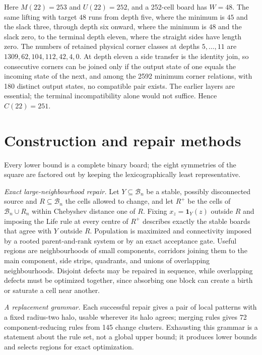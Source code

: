 \documentclass[10pt]{article}
\theoremstyle{remark}
\newcommand{\B}{\mathcal B}
\begin{document}
Here $M(22)=253$ and $U(22)=252$, and a 252-cell board has $W=48$.  The same
lifting with target $48$ runs from depth five, where the minimum is $45$ and the
slack three, through depth six onward, where the minimum is $48$ and the slack
zero, to the terminal depth eleven, where the straight sides have length zero.
The numbers of retained physical corner classes at depths $5,\ldots,11$ are
$1309,62,104,112,42,4,0$.  At depth eleven a side transfer is the identity join,
so consecutive corners can be joined only if the output state of one equals the
incoming state of the next, and among the 2592 minimum corner relations, with 180
distinct output states, no compatible pair exists.  The earlier layers are
essential; the terminal incompatibility alone would not suffice.  Hence
$C(22)=251$.

\section{Construction and repair methods}\label{app:repair}

Every lower bound is a complete binary board; the eight symmetries of the square
are factored out by keeping the lexicographically least representative.

\emph{Exact large-neighbourhood repair.}  Let $Y\subseteq\B_n$ be a stable,
possibly disconnected source and $R\subseteq\B_n$ the cells allowed to change,
and let $R^+$ be the cells of $\B_n\cup R_n$ within Chebyshev distance one of
$R$.  Fixing $x_z=\mathbf1_Y(z)$ outside $R$ and imposing the Life rule at every
centre of $R^+$ describes exactly the stable boards that agree with $Y$ outside
$R$.  Population is maximized and connectivity imposed by a rooted parent-and-rank
system or by an exact acceptance gate.  Useful regions are neighbourhoods of small
components, corridors joining them to the main component, side strips, quadrants,
and unions of overlapping neighbourhoods.  Disjoint defects may be repaired in
sequence, while overlapping defects must be optimized together, since absorbing
one block can create a birth or saturate a cell near another.

\emph{A replacement grammar.}  Each successful repair gives a pair of local
patterns with a fixed radius-two halo, usable wherever its halo agrees; merging
rules gives 72 component-reducing rules from 145 change clusters.  Exhausting
this grammar is a statement about the rule set, not a global upper bound; it
produces lower bounds and selects regions for exact optimization.
\end{document}
